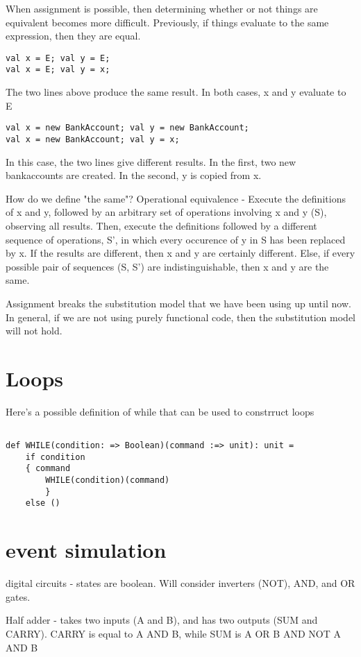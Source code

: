 When assignment is possible, then determining whether or not things are equivalent becomes more difficult. Previously, if things evaluate to the same expression, then they are equal. 

\begin{lstlisting}
val x = E; val y = E;
val x = E; val y = x;
\end{lstlisting}
The two lines above produce the same result. In both cases, x and y evaluate to E
\begin{lstlisting}
val x = new BankAccount; val y = new BankAccount;
val x = new BankAccount; val y = x;
\end{lstlisting}
In this case, the two lines give different results. In the first, two new bankaccounts are created. In the second, y is copied from x.

How do we define "the same"? Operational equivalence - Execute the definitions of x and y, followed by an arbitrary set of operations involving x and y (S), observing all results. Then, execute the definitions followed by a different sequence of operations, S', in which every occurence of y in S has been replaced by x. If the results are different, then x and y are certainly different. Else, if every possible pair of sequences (S, S') are indistinguishable, then x and y are the same.

Assignment breaks the substitution model that we have been using up until now. In general, if we are not using purely functional code, then the substitution model will not hold.

\section{Loops}

Here's a possible definition of while that can be used to constrruct loops
\begin{lstlisting}

def WHILE(condition: => Boolean)(command :=> unit): unit = 
	if condition
	{ command
		WHILE(condition)(command)
		}
	else ()
\end{lstlisting}

 \section{event simulation}

 digital circuits - states are boolean.
 Will consider inverters (NOT), AND, and OR gates.

 Half adder - takes two inputs (A and B), and has two outputs (SUM and CARRY). CARRY is equal to A AND B, while SUM is A OR B AND NOT A AND B



